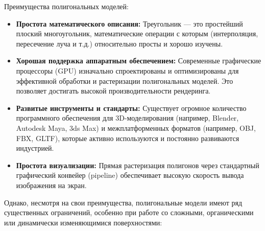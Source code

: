 Преимущества полигональных моделей:

\begin{itemize}
    \item
    \textbf{Простота математического описания:} Треугольник --- это простейший плоский многоугольник, математические операции с которым (интерполяция, пересечение луча и т.д.) относительно просты и хорошо изучены.
    \item
    \textbf{Хорошая поддержка аппаратным обеспечением:} Современные графические процессоры (GPU) изначально спроектированы и оптимизированы для эффективной обработки и растеризации полигональных моделей. Это позволяет достигать высокой производительности рендеринга.
    \item
    \textbf{Развитые инструменты и стандарты:} Существует огромное количество программного обеспечения для 3D-моделирования (например, Blender, Autodesk Maya, 3ds Max) и межплатформенных форматов (например, OBJ, FBX, GLTF), которые активно используются и постоянно развиваются индустрией.
    \item
    \textbf{Простота визуализации:} Прямая растеризация полигонов через стандартный графический конвейер (pipeline) обеспечивает высокую скорость вывода изображения на экран.
\end{itemize}

Однако, несмотря на свои преимущества, полигональные модели имеют ряд существенных ограничений, особенно при работе со сложными, органическими или динамически изменяющимися поверхностями:


